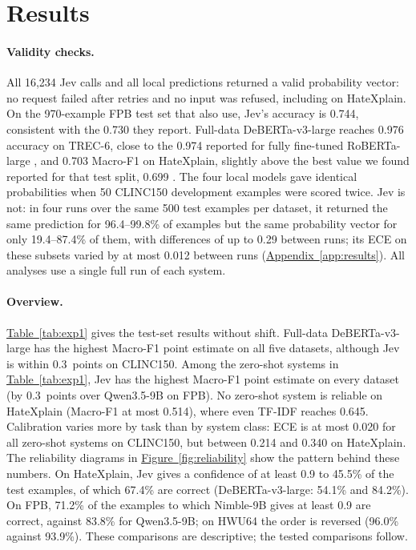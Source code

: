 \section{Results}
\label{sec:results}

\paragraph{Validity checks.}
All 16{,}234 Jev calls and all local predictions returned a valid probability vector: no request failed after retries
and no input was refused, including on HateXplain. On the 970-example FPB test set that \citet{deusser2026jev} also use,
Jev's accuracy is 0.744, consistent with the 0.730 they report. Full-data DeBERTa-v3-large reaches 0.976 accuracy on
TREC-6, close to the 0.974 reported for fully fine-tuned RoBERTa-large \citep{gao2021making}, and 0.703 Macro-F1 on
HateXplain, slightly above the best value we found reported for that test split, 0.699 \citep{kim2022why}. The four local
models gave identical probabilities when 50 CLINC150 development examples were scored twice. Jev is not: in four runs over the same 500 test examples per dataset, it returned the same
prediction for 96.4--99.8\% of examples but the same probability vector for only 19.4--87.4\% of them, with differences of
up to 0.29 between runs; its ECE on these subsets varied by at most 0.012 between runs (\hyperref[app:results]{Appendix~\ref*{app:results}}). All
analyses use a single full run of each system.

\paragraph{Overview.}
\hyperref[tab:exp1]{Table~\ref*{tab:exp1}} gives the test-set results without shift. Full-data DeBERTa-v3-large has the highest Macro-F1 point
estimate on all five datasets, although Jev is within 0.3~points on CLINC150. Among the zero-shot systems in
\hyperref[tab:exp1]{Table~\ref*{tab:exp1}}, Jev has the highest Macro-F1 point estimate on every dataset (by 0.3~points over Qwen3.5-9B on
FPB). No zero-shot system is reliable on HateXplain (Macro-F1 at most 0.514), where even TF-IDF reaches 0.645.
Calibration varies more by task than by system class: ECE is at most 0.020 for all zero-shot systems on CLINC150, but
between 0.214 and 0.340 on HateXplain. The reliability diagrams in \hyperref[fig:reliability]{Figure~\ref*{fig:reliability}}
show the pattern behind these numbers. On HateXplain, Jev gives a confidence of at least 0.9 to 45.5\% of the test
examples, of which 67.4\% are correct (DeBERTa-v3-large: 54.1\% and 84.2\%). On FPB, 71.2\% of the examples to which
Nimble-9B gives at least 0.9 are correct, against 83.8\% for Qwen3.5-9B; on HWU64 the order is reversed (96.0\% against
93.9\%). These comparisons are descriptive; the tested comparisons follow.

